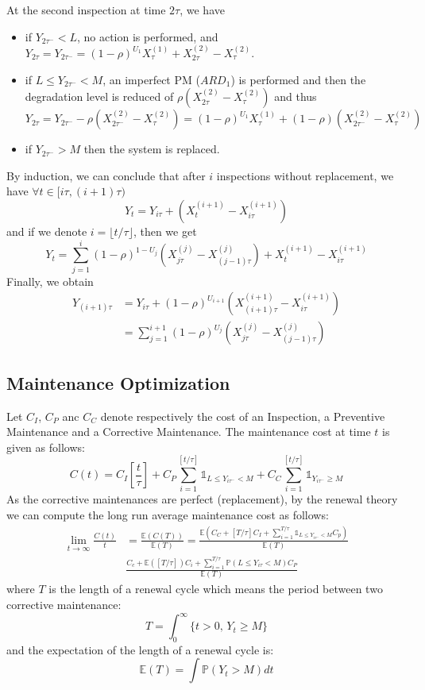 \documentclass[review]{elsarticle}
\begin{document}
At the second inspection at time $2\tau$, we have
\begin{itemize}
	\item if $Y_{2\tau^-} <L$, no action is performed, and $Y_{2\tau} = Y_{2\tau^-} = (1-\rho)^{U_1} X_\tau^{(1)}+X_{2\tau}^{(2)} - X_\tau^{(2)}$.
	\item if $L \leq Y_{2\tau^-} <M$, an imperfect PM ($ARD_1$) is performed and then the degradation level is reduced of $\rho (X_{2\tau}^{(2)}-X_\tau^{(2)})$ and thus 
	$$
	Y_{2\tau} = Y_{2\tau^{-}} -\rho (X_{2\tau^-}^{(2)}-X_\tau^{(2)}) = (1-\rho)^{U_1} X_\tau^{(1)}+(1-\rho)(X_{2\tau^-}^{(2)}-X_\tau^{(2)})
	$$
	\item if $Y_{2\tau^-} >M$ then the system is replaced.
\end{itemize}

By induction, we can conclude that after $i$ inspections without replacement, we have $\forall t\in [i\tau,(i+1)\tau)$
$$
Y_t = Y_{i\tau} + (X_t^{(i+1)}-X_{i\tau}^{(i+1)})
$$
and if we denote $i=\lfloor t/\tau\rfloor$, then we get
$$
Y_t = \displaystyle\sum_{j=1}^{i} (1-\rho)^{1-U_j}(X_{j\tau}^{(j)}-X_{(j-1)\tau}^{(j)}) + X_t^{(i+1)}-X_{i\tau}^{(i+1)}
$$
Finally, we obtain
\begin{align}
Y_{(i+1)\tau} & = Y_{i\tau} + (1-\rho)^{U_{i+1}}(X_{(i+1)\tau}^{(i+1)}-X_{i\tau}^{(i+1)})\nonumber\\
& = \displaystyle\sum_{j=1}^{i+1} (1-\rho)^{U_{j}} (X_{j\tau}^{(j)}-X_{(j-1)\tau}^{(j)})
\end{align}




\subsection{Maintenance Optimization}
Let $C_I$, $C_P$ anc $C_C$ denote respectively the cost of an Inspection, a Preventive Maintenance and a Corrective Maintenance.
The maintenance cost at time $t$ is given as follows:
$$C(t)=C_I [\frac{t}{\tau}] +C_P \sum_{i=1}^{[t/\tau]}{\mathds 1}_{L\leq Y_{i\tau^-}< M}+ C_C \sum_{i=1}^{[t/\tau]}{\mathds 1}_{ Y_{i\tau^-}\geq M}$$
As the corrective maintenances are perfect (replacement), by the renewal theory we can compute the long run average maintenance cost as follows:
\begin{align}\label{eq-Ct-ECT}
\lim_{t\to\infty}\frac{C(t)}{t}&=\frac{{\mathds E}(C(T))}{{\mathds E}(T)}=\frac{ {\mathds E}(C_C + [T/\tau] C_I + \sum_{i=1}^ {T/\tau} {\mathds 1}_{L \leq Y_{i \tau^-}< M}  C_p)
}{{\mathds E}(T)}\nonumber\\
&\frac{C_c+ {\mathds E}([T/\tau]) C_i+ \sum_{i=1}^ {T/\tau} {\mathds P}({L \leq Y_{i \tau}< M}) C_P}{{\mathds E}(T)}
\end{align}
where $T$ is the length of a renewal cycle which means the period between two corrective maintenance:
$$
T = \int_{0}^{\infty} \{t>0,\,Y_t\geq M\}
$$
and the expectation of the length of a renewal cycle is:
\begin{equation}\label{eq-ET}
{\mathds E}(T)=\int {\mathds P}(Y_t>M) dt
\end{equation}
\end{document}
